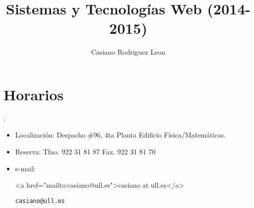 \documentclass[11pt,a4paper]{article}
\title{
Sistemas y Tecnologías Web (2014-2015)
}
\author{Casiano Rodriguez Leon}
\begin{document}
\maketitle
{}


\section{Horarios}

    :

    \begin{itemize}
      \item Localización: Despacho \#96, 4ta Planta Edificio Física/Matem\'aticas. 
      \item Reserva: Tfno. 922 31 81 87 Fax. 922 31 81 70
      \item e-mail:
      \begin{htmlonly}
      \begin{rawhtml}
         <a href="mailto:casiano@ull.es">casiano at ull.es</a>
      \end{rawhtml}
      \end{htmlonly}
      \begin{latexonly}
         \verb#casiano@ull.es#
      \end{latexonly}
    \end{itemize}
\end{document}
